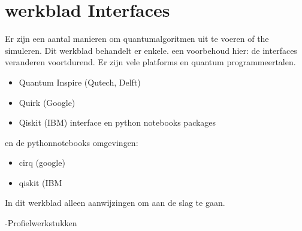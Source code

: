 \documentclass[../main.tex]{subfiles}
\begin{document}
\onlyinsubfile{
\setcounter{chapter}{0}
}
\notinsubfile{}
\section{werkblad Interfaces}\label{sec:interfaces}

Er zijn een aantal manieren om quantumalgoritmen uit te voeren of the simuleren. Dit werkblad behandelt er enkele. een voorbehoud hier: de interfaces veranderen voortdurend. Er zijn vele platforms en quantum programmeertalen. 
\begin{itemize}
\item Quantum Inspire (Qutech, Delft)
\item Quirk (Google)
\item Qiskit (IBM) interface en python notebooks packages

\end{itemize}
en de pythonnotebooks omgevingen:
\begin{itemize}[resume]
\item cirq (google)
\item qiskit (IBM
\end{itemize}

In dit werkblad alleen aanwijzingen om aan de slag te gaan. 

-Profielwerkstukken
\end{document}

